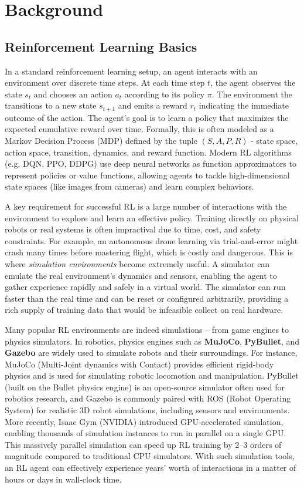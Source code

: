 \section{Background}

\subsection{Reinforcement Learning Basics}
In a standard reinforcement learning setup, an agent interacts with an environment over discrete time steps. At each time step $t$, the agent observes the state $s_t$ and chooses an action $a_t$ according to its policy $\pi$. The environment the transitions to a new state $s_{t+1}$ and emits a reward $r_t$ indicating the immediate outcome of the action. The agent's goal is to learn a policy that maximizes the expected cumulative reward over time. Formally, this is often modeled as a Markov Decision Process (MDP) defined by the tuple $(S, A, P, R)$ - state space, action space, transition, dynamics, and reward function. Modern RL algorithms (e.g. DQN, PPO, DDPG) use deep neural networks as function approximators to represent policies or value functions, allowing agents to tackle high-dimensional state spaces (like images from cameras) and learn complex behaviors.

A key requirement for successful RL is a large number of interactions with the environment to explore and learn an effective policy. Training directly on physical robots or real systems is often impractival due to time, cost, and safety constraints. For example, an autonomous drone learning via trial-and-error might crash many times before mastering flight, which is costly and dangerous. This is where \textit{simulation environments} become extremely useful. A simulator can emulate the real environment's dynamics and sensors, enabling the agent to gather experience rapidly and safely in a virtual world. The simulator can run faster than the real time and can be reset or configured arbitrarily, providing a rich supply of training data that would be infeasible collect on real hardware. 

Many popular RL environments are indeed simulations – from game engines to physics simulators. In robotics, physics engines such as \textbf{MuJoCo}, \textbf{PyBullet}, and \textbf{Gazebo} are widely used to simulate robots and their surroundings. For instance, MuJoCo (Multi-Joint dynamics with Contact) provides efficient rigid-body physics and is used for simulating robotic locomotion and manipulation. PyBullet (built on the Bullet physics engine) is an open-source simulator often used for robotics research, and Gazebo is commonly paired with ROS (Robot Operating System) for realistic 3D robot simulations, including sensors and environments. More recently, Isaac Gym (NVIDIA) introduced GPU-accelerated simulation, enabling thousands of simulation instances to run in parallel on a single GPU. This massively parallel simulation can speed up RL training by 2–3 orders of magnitude compared to traditional CPU simulators. With such simulation tools, an RL agent can effectively experience years’ worth of interactions in a matter of hours or days in wall-clock time.

